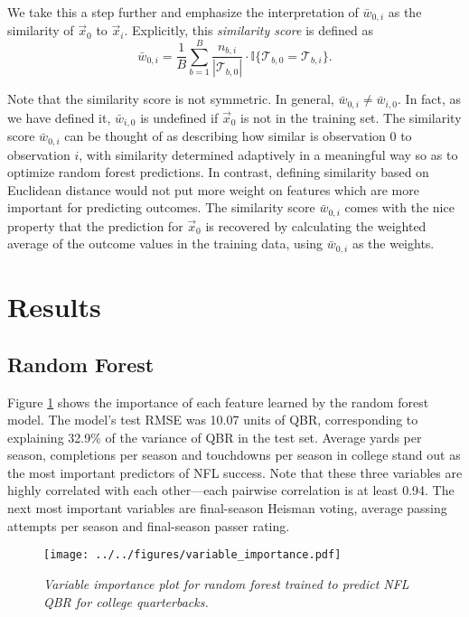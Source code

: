 \documentclass{article}
\begin{document}
We take this a step further and emphasize the interpretation of $\bar w_{0,i}$ as the similarity of $\vec x_0$ to $\vec x_i$. Explicitly, this {\it similarity score} is defined as
\begin{equation}
  \label{eqn:similarity}
  \bar w_{0,i} = \frac{1}{B}\sum_{b = 1}^B
    \frac{n_{b,i}}{|\mathcal{T}_{b,0}|} \cdot \mathbb{I}\{\mathcal{T}_{b,0} = \mathcal{T}_{b,i}\}.
\end{equation}

Note that the similarity score is not symmetric. In general, $\bar w_{0,i} \ne \bar w_{i,0}$. In fact, as we have defined it, $\bar w_{i,0}$ is undefined if $\vec x_0$ is not in the training set. The similarity score $\bar w_{0,i}$ can be thought of as describing how similar is observation 0 to observation $i$, with similarity determined adaptively in a meaningful way so as to optimize random forest predictions. In contrast, defining similarity based on Euclidean distance would not put more weight on features which are more important for predicting outcomes. The similarity score $\bar w_{0,i}$ comes with the nice property that the prediction for $\vec x_0$ is recovered by calculating the weighted average of the outcome values in the training data, using $\bar w_{0,i}$ as the weights.

\section{Results}
\label{sec:results}

\subsection{Random Forest}

Figure \ref{fig:importance} shows the importance of each feature learned by the random forest model. The model's test RMSE was 10.07 units of QBR, corresponding to explaining 32.9\% of the variance of QBR in the test set. Average yards per season, completions per season and touchdowns per season in college stand out as the most important predictors of NFL success. Note that these three variables are highly correlated with each other---each pairwise correlation is at least 0.94. The next most important variables are final-season Heisman voting, average passing attempts per season and final-season passer rating.

\begin{figure}[H]
    \centering
    \texttt{[image: ../../figures/variable\_importance.pdf]}
    \caption{\textit{Variable importance plot for random forest trained to predict NFL QBR for college quarterbacks.}}
    \label{fig:importance}
\end{figure}
\end{document}
